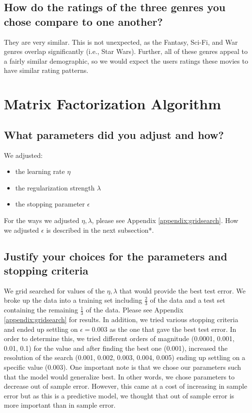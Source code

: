 \subsection*{How do the ratings of the three genres you chose compare to one another?}
They are very similar. This is not unexpected, as the Fantasy, Sci-Fi, and War genres overlap significantly (i.e., Star Wars). Further, all of these genres appeal to a fairly similar demographic, so we would expect the users ratings these movies to have similar rating patterns.
\pagebreak

\section{Matrix Factorization Algorithm}
\medskip
\subsection*{What parameters did you adjust and how?}
\noindent We adjusted:
\begin{itemize}
  \item the learning rate $\eta$
  \item the regularization strength $\lambda$
  \item the stopping parameter $\epsilon$
\end{itemize}
For the ways we adjusted $\eta,\lambda$, please see Appendix \ref{appendix:gridsearch}. How we adjusted $\epsilon$ is described in the next subsection*.

\subsection*{Justify your choices for the parameters and stopping criteria}
We grid searched for values of the $\eta,\lambda$ that would provide the best test error. We broke up the data into a training set including $\frac{2}{3}$ of the data and a test set containing the remaining $\frac{1}{3}$ of the data. Please see Appendix \ref{appendix:gridsearch} for results. In addition, we tried various stopping criteria and ended up settling on $\epsilon=0.003$ as the one that gave the best test error. In order to determine this, we tried different orders of magnitude (0.0001, 0.001, 0.01, 0.1) for the value and after finding the best one (0.001), increased the resolution of the search (0.001, 0.002, 0.003, 0.004, 0.005) ending up settling on a specific value (0.003). One important note is that we chose our parameters such that the model would generalize best. In other words, we chose parameters to decrease out of sample error. However, this came at a cost of increasing in sample error but as this is a predictive model, we thought that out of sample error is more important than in sample error.

